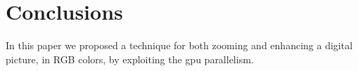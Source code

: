 \section{Conclusions}

In this paper we proposed a technique for both zooming and enhancing a digital picture, in RGB colors, by exploiting the gpu parallelism. 
 




